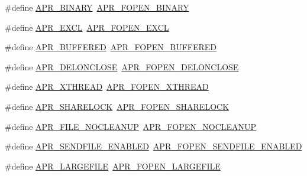 \begin{DoxyCompactItemize}
\#define \mbox{\hyperlink{group__apr__file__open__flags_ga0e7556bac0cc0d1dafdf38952a4e4015}{A\+P\+R\+\_\+\+B\+I\+N\+A\+RY}}~\mbox{\hyperlink{group__apr__file__open__flags_gacb20b3028864f34cb26314fe2cacc3fa}{A\+P\+R\+\_\+\+F\+O\+P\+E\+N\+\_\+\+B\+I\+N\+A\+RY}}
\item 
\#define \mbox{\hyperlink{group__apr__file__open__flags_ga209c26b2b903cc23417f6781d4edf891}{A\+P\+R\+\_\+\+E\+X\+CL}}~\mbox{\hyperlink{group__apr__file__open__flags_gabb7fb062cdf1d58faee8c7ea518496f1}{A\+P\+R\+\_\+\+F\+O\+P\+E\+N\+\_\+\+E\+X\+CL}}
\item 
\#define \mbox{\hyperlink{group__apr__file__open__flags_ga6edc818199e8b90e3dabf97c42a27158}{A\+P\+R\+\_\+\+B\+U\+F\+F\+E\+R\+ED}}~\mbox{\hyperlink{group__apr__file__open__flags_gac48fd4c853c9f561632a2e8aaf5d8d97}{A\+P\+R\+\_\+\+F\+O\+P\+E\+N\+\_\+\+B\+U\+F\+F\+E\+R\+ED}}
\item 
\#define \mbox{\hyperlink{group__apr__file__open__flags_gaebc7f034a72dffe64858b1b9451994ff}{A\+P\+R\+\_\+\+D\+E\+L\+O\+N\+C\+L\+O\+SE}}~\mbox{\hyperlink{group__apr__file__open__flags_ga5d3756f6d242c667ed1d3f54af4916eb}{A\+P\+R\+\_\+\+F\+O\+P\+E\+N\+\_\+\+D\+E\+L\+O\+N\+C\+L\+O\+SE}}
\item 
\#define \mbox{\hyperlink{group__apr__file__open__flags_gaa9120c0e395d8a0e640b5eafa8f11cce}{A\+P\+R\+\_\+\+X\+T\+H\+R\+E\+AD}}~\mbox{\hyperlink{group__apr__file__open__flags_ga435cd9b2604b11796779c23ffa00a3dd}{A\+P\+R\+\_\+\+F\+O\+P\+E\+N\+\_\+\+X\+T\+H\+R\+E\+AD}}
\item 
\#define \mbox{\hyperlink{group__apr__file__open__flags_ga41277154f4f754a22287ed90e9466811}{A\+P\+R\+\_\+\+S\+H\+A\+R\+E\+L\+O\+CK}}~\mbox{\hyperlink{group__apr__file__open__flags_ga426f6e2a8457ab410d99248269059a18}{A\+P\+R\+\_\+\+F\+O\+P\+E\+N\+\_\+\+S\+H\+A\+R\+E\+L\+O\+CK}}
\item 
\#define \mbox{\hyperlink{group__apr__file__open__flags_ga3ef1061dbb3adf595701bd12edb062f9}{A\+P\+R\+\_\+\+F\+I\+L\+E\+\_\+\+N\+O\+C\+L\+E\+A\+N\+UP}}~\mbox{\hyperlink{group__apr__file__open__flags_ga3fc9b5a7791d9f462997cd29de67eb80}{A\+P\+R\+\_\+\+F\+O\+P\+E\+N\+\_\+\+N\+O\+C\+L\+E\+A\+N\+UP}}
\item 
\#define \mbox{\hyperlink{group__apr__file__open__flags_ga17e216aadb23254580258889e10c53f3}{A\+P\+R\+\_\+\+S\+E\+N\+D\+F\+I\+L\+E\+\_\+\+E\+N\+A\+B\+L\+ED}}~\mbox{\hyperlink{group__apr__file__open__flags_ga60c21e28e4a612d58a874fe2cc71a6e4}{A\+P\+R\+\_\+\+F\+O\+P\+E\+N\+\_\+\+S\+E\+N\+D\+F\+I\+L\+E\+\_\+\+E\+N\+A\+B\+L\+ED}}
\item 
\#define \mbox{\hyperlink{group__apr__file__open__flags_gaafa04fd4ec71910a5d7af1c7f5596bad}{A\+P\+R\+\_\+\+L\+A\+R\+G\+E\+F\+I\+LE}}~\mbox{\hyperlink{group__apr__file__open__flags_gaf6cfaa4789e6264afd186235f0adbc22}{A\+P\+R\+\_\+\+F\+O\+P\+E\+N\+\_\+\+L\+A\+R\+G\+E\+F\+I\+LE}}
\end{DoxyCompactItemize}


